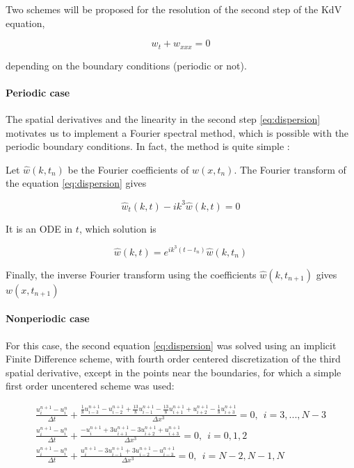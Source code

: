 \indent Two schemes will be proposed for the resolution of the second step of the KdV equation,

\begin{equation}
	\label{eq:dispersion}
	w_t + w_{xxx} = 0
\end{equation}

\noindent depending on the boundary conditions (periodic or not).

\paragraph{Periodic case}

\indent The spatial derivatives and the linearity in the second step \eqref{eq:dispersion} motivates us to implement a Fourier spectral method, which is possible with the periodic boundary conditions. In fact, the method is quite simple :

\indent Let $\hat{w}(k,t_n)$ be the Fourier coefficients of $w(x,t_n)$.  The Fourier transform of the equation \eqref{eq:dispersion} gives

\begin{equation}
	\hat{w}_t(k,t) - ik^3\hat{w}(k,t) = 0
\end{equation}

\indent It is an ODE in $t$,  which solution is

\begin{equation}
\hat{w}(k,t) = e^{ik^3(t-t_n)}\hat{w}(k,t_n)
\end{equation}

\indent Finally, the inverse Fourier transform using the coefficients $\hat{w}(k,t_{n+1})$ gives $w(x,t_{n+1})$

\paragraph{Nonperiodic case}

\indent For this case, the second equation \eqref{eq:dispersion} was solved using an implicit Finite Difference scheme, with fourth order centered discretization of the third spatial derivative, except in the points near the boundaries, for which a simple first order uncentered scheme was used:

\begin{gather}
	\label{eq:IFDSolverKdV}
	\frac{u_i^{n+1} - u_i^n}{\Delta t} + \frac{\frac{1}{8}u_{i-3}^{n+1} - u_{i-2}^{n+1}  + \frac{13}{8}u_{i-1}^{n+1} - \frac{13}{8}u_{i+1}^{n+1} + u_{i+2}^{n+1} - \frac{1}{8}u_{i+3}^{n+1}}{\Delta x^3} = 0, \ \ i = 3,...,N-3 \\
	\frac{u_i^{n+1} - u_i^n}{\Delta t}  + \frac{-u_{i}^{n+1} + 3u_{i+1}^{n+1}  -3 u_{i+2}^{n+1} + u_{i+3}^{n+1} }{\Delta x^3} = 0, \ \ i = 0,1,2 \\
	\frac{u_i^{n+1} - u_i^n}{\Delta t}  + \frac{u_{i}^{n+1} - 3u_{i-1}^{n+1}  + 3 u_{i-2}^{n+1} - u_{i-3}^{n+1} }{\Delta x^3} = 0, \ \ i = N-2,N-1,N \\
\end{gather} 

